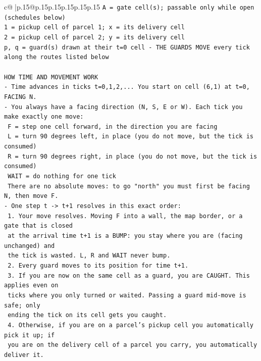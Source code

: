 \documentclass{article}
\begin{document}
{\begin{supertabular}{c@{$\;$}|p{.15\linewidth}@{}p{.15\linewidth}p{.15\linewidth}p{.15\linewidth}p{.15\linewidth}p{.15\linewidth}}
{{{\texttt{A = gate cell(s); passable only while open (schedules below)} \\
\texttt{1 = pickup cell of parcel 1; x = its delivery cell} \\
\texttt{2 = pickup cell of parcel 2; y = its delivery cell} \\
\texttt{p, q = guard(s) drawn at their t=0 cell {-} THE GUARDS MOVE every tick along the routes listed below} \\
\\ 
\texttt{HOW TIME AND MOVEMENT WORK} \\
\texttt{{-} Time advances in ticks t=0,1,2,... You start on cell (6,1) at t=0, FACING N.} \\
\texttt{{-} You always have a facing direction (N, S, E or W). Each tick you make exactly one move:} \\
\texttt{  F    = step one cell forward, in the direction you are facing} \\
\texttt{  L    = turn 90 degrees left, in place (you do not move, but the tick is consumed)} \\
\texttt{  R    = turn 90 degrees right, in place (you do not move, but the tick is consumed)} \\
\texttt{  WAIT = do nothing for one tick} \\
\texttt{  There are no absolute moves: to go "north" you must first be facing N, then move F.} \\
\texttt{{-} One step t {-}> t+1 resolves in this exact order:} \\
\texttt{  1. Your move resolves. Moving F into a wall, the map border, or a gate that is closed} \\
\texttt{     at the arrival time t+1 is a BUMP: you stay where you are (facing unchanged) and} \\
\texttt{     the tick is wasted. L, R and WAIT never bump.} \\
\texttt{  2. Every guard moves to its position for time t+1.} \\
\texttt{  3. If you are now on the same cell as a guard, you are CAUGHT. This applies even on} \\
\texttt{     ticks where you only turned or waited. Passing a guard mid{-}move is safe; only} \\
\texttt{     ending the tick on its cell gets you caught.} \\
\texttt{  4. Otherwise, if you are on a parcel's pickup cell you automatically pick it up; if} \\
\texttt{     you are on the delivery cell of a parcel you carry, you automatically deliver it.} \\
}}}
\end{supertabular}}
\end{document}
